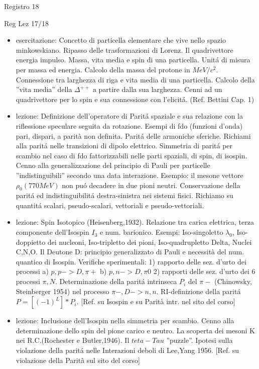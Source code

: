 \begin{frame}{Registro 18}
\begin{frame}[allowframebreaks]{Reg Lez 17/18}
\begin{itemize}
\item esercitazione: Concetto di particella elementare che vive nello spazio minkowskiano. Ripasso delle trasformazioni di Lorenz. Il quadrivettore energia impulso. Massa, vita media e spin di una particella. Unit\'a di misura per massa ed energia. Calcolo della massa del protone in $MeV/c^2$. Connessione tra larghezza di riga e vita media di una particella. Calcolo della ''vita media'' della $\Delta^{++}$ a partire dalla sua larghezza. Cenni ad un quadrivettore per lo spin e sua connessione con l'elicit\'a. (Ref. Bettini Cap. 1) 

\item lezione: Definizione dell'operatore di Parit\'a spaziale e sua relazione con la riflessione speculare seguita da rotazione. Esempi di fdo (funzioni d'onda) pari, dispari, a parità non definita.  Parit\'a delle armoniche sferiche. Richiami alla parit\'a nelle transizioni di dipolo elettrico. Simmetria di  parit\'a per scambio nel caso di fdo fattorizzabili nelle parti spaziali, di spin, di isospin. Cenno alla generalizzazione del principio di Pauli per particelle ''indistinguibili'' secondo una data interazione. Esempio: il mesone vettore $\rho_0(770 MeV)$ non pu\'o decadere in due pioni neutri. Conservazione della parit\'a ed indistinguibilit\'a destra-sinistra nei sistemi fisici. Richiamo su quantit\'a scalari, pseudo-scalari, vettoriali e pseudo-vettoriali.

\item lezione: Spin Isotopico (Heisenberg,1932). Relazione tra carica elettrica, terza componente dell'Isospin $I_3$ e num. barionico. Esempi: Iso-singoletto $\lambda_0$, Iso-doppietto dei nucleoni, Iso-tripletto dei pioni, Iso-quadrupletto Delta, Nuclei C,N,O. Il Deutone D: principio generalizzato di Pauli e necessità del num. quantico di Isospin. Verifiche sperimentali: 1) rapporto delle sez. d'urto dei processi a) $p,p->D,\pi+$ b) $p,n->D,\pi0$ 2) rapporti delle sez. d'urto dei 6 processi $\pi,N$. Determinazione della parit\'a intrinseca $P_i$ del $\pi-$ (Chinowsky, Steinberger 1954) nel processo $\pi-,D->n,n$. RI-definizione della parit\'a $P=[(-1)^L]*P_i$. [Ref. su Isospin e su Parità intr. nel sito del corso]

\item lezione: Inclusione dell'Isospin nella simmetria per scambio. Cenno alla determinazione dello spin del pione carico e neutro. La scoperta dei mesoni K nei R.C.(Rochester e Butler,1946). Il $teta-Tau$ ''puzzle''. Ipotesi sulla violazione della parit\'a nelle Interazioni deboli di Lee,Yang 1956. [Ref. su violazione della Parità sul sito del corso]


\end{itemize}
\end{frame}
\end{frame}
